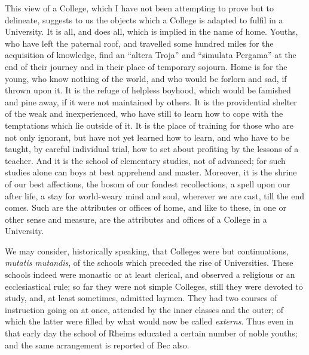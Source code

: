 This view of a College, which
I have not been attempting to prove but to delineate, suggests to us
the objects which a College is adapted to fulfil in a University. It
is all, and does all, which is implied in the name of home. Youths,
who have left the paternal roof, and travelled some hundred miles for
the acquisition of knowledge, find an ``altera Troja'' and ``simulata Pergama'' at the end of their journey and in their place
of temporary sojourn. Home is for the young, who know nothing of the
world, and who would be forlorn and sad, if thrown upon it. It is the
refuge of helpless boyhood, which would be famished and pine away, if
it were not maintained by others. It is the providential shelter of
the weak and inexperienced, who have still to learn how to cope with
the temptations which lie outside of it. It is the place of training
for those who are not only ignorant, but have not yet learned how to
learn, and who have to be taught, by careful individual trial,
how to set about profiting by the lessons of a teacher. And it is the
school of elementary studies, not of advanced; for such studies alone
can boys at best apprehend and master. Moreover, it is the shrine of
our best affections, the bosom of our fondest recollections, a spell
upon our after life, a stay for world-weary mind and soul, wherever we
are cast, till the end comes. Such are the attributes or offices of
home, and like to these, in one or other sense and measure, are the
attributes and offices of a College in a University.

We may consider, historically
speaking, that Colleges were but continuations, \emph{mutatis mutandis},
of the schools which preceded the rise of Universities. These schools
indeed were monastic or at least clerical, and observed a religious or
an ecclesiastical rule; so far they were not simple Colleges, still
they were devoted to study, and, at least sometimes, admitted laymen.
They had two courses of instruction going on at once, attended by the
inner classes and the outer; of which the latter were filled by what
would now be called \emph{externs}. Thus even in that early day the
school of Rheims educated a certain number of noble youths; and the
same arrangement is reported of Bec also.


